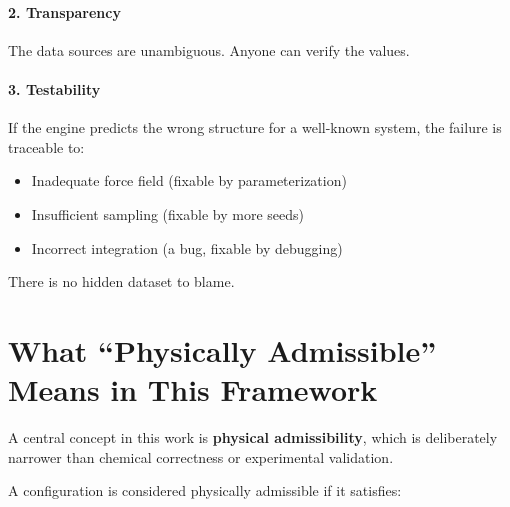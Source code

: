 \documentclass[11pt]{article}
\begin{document}
\paragraph{2. Transparency} The data sources are unambiguous. Anyone can verify the values.

\paragraph{3. Testability} If the engine predicts the wrong structure for a well-known system, the failure is traceable to:
\begin{itemize}
\item Inadequate force field (fixable by parameterization)
\item Insufficient sampling (fixable by more seeds)
\item Incorrect integration (a bug, fixable by debugging)
\end{itemize}

There is no hidden dataset to blame.

\section{What ``Physically Admissible'' Means in This Framework}

A central concept in this work is \textbf{physical admissibility}, which is deliberately narrower than chemical correctness or experimental validation.

A configuration is considered physically admissible if it satisfies:
\end{document}
